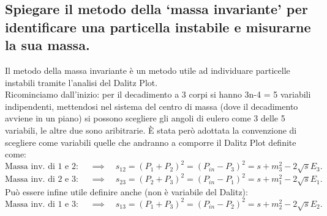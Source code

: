 \subsection[$\ $ Metodo della massa invariante]{Spiegare il metodo della ‘massa invariante’ per identificare una particella instabile e misurarne la sua massa.}
Il metodo della massa invariante è un metodo utile ad individuare particelle instabili tramite l'analisi del Dalitz Plot.\\
Ricominciamo dall'inizio: per il decadimento a 3 corpi si hanno 3n-4 = 5 variabili indipendenti, mettendosi nel sistema del centro di massa (dove il decadimento avviene in un piano) si possono scegliere gli angoli di eulero come 3 delle 5 variabili, le altre due sono aribitrarie.
È stata però adottata la convenzione di scegliere come variabili quelle che andranno a comporre il Dalitz Plot definite come:
\[
	\text{Massa inv. di 1 e 2: }  \quad \implies \quad 
	s_{12} = \left( P_1 + P_2 \right)^2 = \left( P_{in} - P_3 \right)^2 = s + m_3^2 - 2\sqrt{s} E_3 
.\] 
\[
	\text{Massa inv. di 2 e 3: } \quad \implies \quad  
	s_{23} = \left( P_2 + P_3 \right)^2 = \left( P_{in} - P_1 \right)^2 = s + m_1^2 -2 \sqrt{s} E_1 
.\] 
Può essere infine utile definire anche (non è variabile del Dalitz):
\[
	\text{Massa inv. di 1 e 3: }  \quad \implies \quad 
	s_{13} = \left( P_1 + P_3 \right)^2 = \left( P_{in} - P_2 \right)^2 = s + m_2^2 - 2\sqrt{s} E_2 
.\] 

